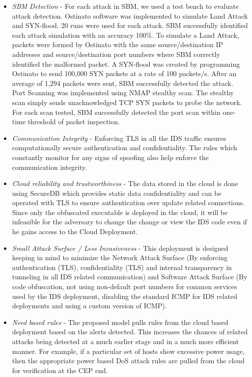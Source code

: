 \documentclass[conference]{sig-alternate-05-2015}
\begin{document}
\begin{itemize}
  \item \textit{SBM Detection} - For each attack in SBM, we used a test bench to evaluate attack detection.  Ostinato software was implemented to simulate Land Attack and SYN-flood.  20 runs were used for each attack.  SBM successfully identified each attack simulation with an accuracy 100\%.  To simulate a Land Attack, packets were formed by Ostinato with the same source/destination IP addresses and source/destination port numbers where SBM correctly identified the malformed packet.  A SYN-flood was created by programming Ostinato to send 100,000 SYN packets at a rate of 100 packets/s.  After an average of 1,294 packets were sent, SBM successfully detected the attack.  Port Scanning was implemented using NMAP stealthy scan.  The stealthy scan simply sends unacknowledged TCP SYN packets to probe the network.  For each scan tested, SBM successfully detected the port scan within one-time threshold of packet inspection.
  \item \textit{Communication Integrity} - Enforcing TLS in all the IDS traffic ensures computationally secure authentication and confidentiality. The rules which constantly monitor for any signs of spoofing also help enforce the communication integrity.
  \item \textit{Cloud reliability and trustworthiness} - The data stored in the cloud is done using SecureDB \cite{securedb} which provides static data confidentiality and can be operated with TLS to ensure authentication over update related connections. Since only the obfuscated executable is deployed in the cloud, it will be infeasible for the adversary to change the change or view the IDS code even if he gains access to the Cloud Deployment. 
  \item \textit{Small Attack Surface / Less Invasiveness} - This deployment is designed keeping in mind to minimize the Network Attack Surface (By enforcing authentication (TLS), confidentiality (TLS) and internal transparency in tunneling in all IDS related communication) and Software Attack Surface (By code obfuscation, not using non-default port numbers for common services used by the IDS deployment, disabling the standard ICMP for IDS related deployments and using a custom version of ICMP).
  \item \textit{Need based rules} - The proposed model pulls rules from the cloud based deployment based on the alerts detected. This increases the chances of related attacks being detected at a much earlier stage and in a much more efficient manner. For example, if a particular set of hosts show excessive power usage, then the appropriate power based DoS attack rules are pulled from the cloud for verification at the CEP end.

\end{itemize}
\end{document}
